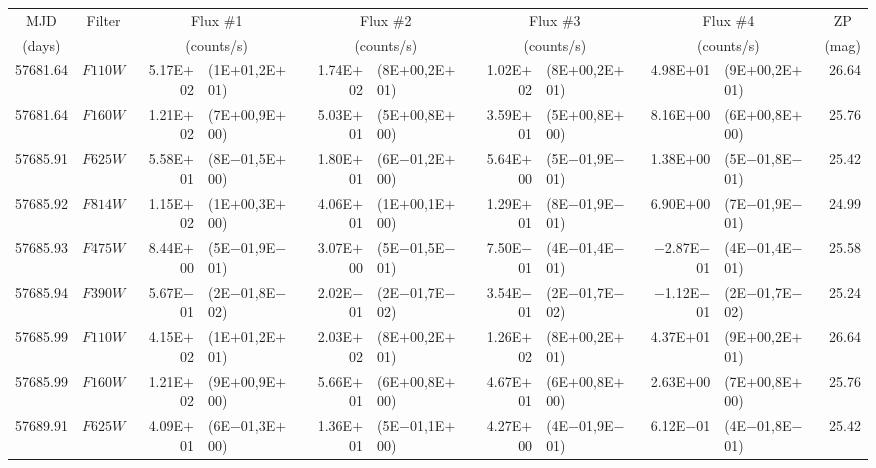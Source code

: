 \begin{tabular}{r c r @{\hspace{0.5em}} l r @{\hspace{0.5em}} l r @{\hspace{0.5em}} l r @{\hspace{0.5em}} l r}
\hline\hline
\multicolumn{1}{c}{MJD} & \multicolumn{1}{c}{Filter} & \multicolumn{2}{c}{Flux \#1} & \multicolumn{2}{c}{Flux \#2} & \multicolumn{2}{c}{Flux \#3} & \multicolumn{2}{c}{Flux \#4} & \multicolumn{1}{c}{ZP}\\
\multicolumn{1}{c}{(days)} & & \multicolumn{2}{c}{(counts/s)} & \multicolumn{2}{c}{(counts/s)} & \multicolumn{2}{c}{(counts/s)} & \multicolumn{2}{c}{(counts/s)} & \multicolumn{1}{c}{(mag)}\\
\hline
57681.64 & $F110W$ & 5.17E$+$02 & (1E$+$01,2E$+$01) & 1.74E$+$02 & (8E$+$00,2E$+$01) & 1.02E$+$02 & (8E$+$00,2E$+$01) & 4.98E$+$01 & (9E$+$00,2E$+$01) & 26.64\\
57681.64 & $F160W$ & 1.21E$+$02 & (7E$+$00,9E$+$00) & 5.03E$+$01 & (5E$+$00,8E$+$00) & 3.59E$+$01 & (5E$+$00,8E$+$00) & 8.16E$+$00 & (6E$+$00,8E$+$00) & 25.76\\
57685.91 & $F625W$ & 5.58E$+$01 & (8E$-$01,5E$+$00) & 1.80E$+$01 & (6E$-$01,2E$+$00) & 5.64E$+$00 & (5E$-$01,9E$-$01) & 1.38E$+$00 & (5E$-$01,8E$-$01) & 25.42\\
57685.92 & $F814W$ & 1.15E$+$02 & (1E$+$00,3E$+$00) & 4.06E$+$01 & (1E$+$00,1E$+$00) & 1.29E$+$01 & (8E$-$01,9E$-$01) & 6.90E$+$00 & (7E$-$01,9E$-$01) & 24.99\\
57685.93 & $F475W$ & 8.44E$+$00 & (5E$-$01,9E$-$01) & 3.07E$+$00 & (5E$-$01,5E$-$01) & 7.50E$-$01 & (4E$-$01,4E$-$01) & $-$2.87E$-$01 & (4E$-$01,4E$-$01) & 25.58\\
57685.94 & $F390W$ & 5.67E$-$01 & (2E$-$01,8E$-$02) & 2.02E$-$01 & (2E$-$01,7E$-$02) & 3.54E$-$01 & (2E$-$01,7E$-$02) & $-$1.12E$-$01 & (2E$-$01,7E$-$02) & 25.24\\
57685.99 & $F110W$ & 4.15E$+$02 & (1E$+$01,2E$+$01) & 2.03E$+$02 & (8E$+$00,2E$+$01) & 1.26E$+$02 & (8E$+$00,2E$+$01) & 4.37E$+$01 & (9E$+$00,2E$+$01) & 26.64\\
57685.99 & $F160W$ & 1.21E$+$02 & (9E$+$00,9E$+$00) & 5.66E$+$01 & (6E$+$00,8E$+$00) & 4.67E$+$01 & (6E$+$00,8E$+$00) & 2.63E$+$00 & (7E$+$00,8E$+$00) & 25.76\\
57689.91 & $F625W$ & 4.09E$+$01 & (6E$-$01,3E$+$00) & 1.36E$+$01 & (5E$-$01,1E$+$00) & 4.27E$+$00 & (4E$-$01,9E$-$01) & 6.12E$-$01 & (4E$-$01,8E$-$01) & 25.42\\

\end{tabular}
